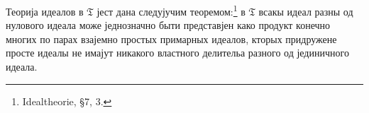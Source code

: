 \documentclass[11pt]{article}
\newcommand{\mT}{\mathfrak{T}}
\begin{document}
\setcounter{footnote}{28}

\noindent Теорија идеалов в $\mT$ јест дана следујучим теоремом:\footnote{Idealtheorie, \S 7, 3.} в $\mT$ всакы идеал разны од нулового идеала може једнозначно быти представјен како продукт конечно многих по парах взајемно простых примарных идеалов, кторых придружене просте идеалы не имајут никакого властного делительа разного од јединичного идеала.
\end{document}
